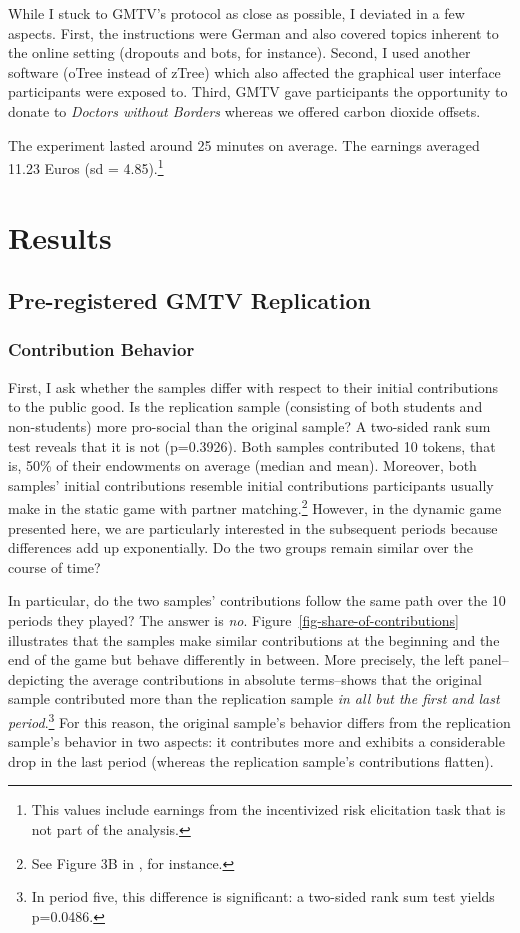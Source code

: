 \documentclass[
  authoryear,
  preprint,
  3p]{elsarticle}
\begin{document}
While I stuck to GMTV's protocol as close as possible, I deviated in a
few aspects. First, the instructions were German and also covered topics
inherent to the online setting (dropouts and bots, for instance).
Second, I used another software (oTree instead of zTree) which also
affected the graphical user interface participants were exposed to.
Third, GMTV gave participants the opportunity to donate to \emph{Doctors
without Borders} whereas we offered carbon dioxide offsets.

The experiment lasted around 25 minutes on average. The earnings
averaged 11.23 Euros (sd = 4.85).\footnote{This values include earnings
  from the incentivized risk elicitation task that is not part of the
  analysis.}

\hypertarget{sec-results}{%
\section{Results}\label{sec-results}}

\hypertarget{sec-replication}{%
\subsection{Pre-registered GMTV Replication}\label{sec-replication}}

\hypertarget{sec-contributions}{%
\subsubsection{Contribution Behavior}\label{sec-contributions}}

First, I ask whether the samples differ with respect to their initial
contributions to the public good. Is the replication sample (consisting
of both students and non-students) more pro-social than the original
sample? A two-sided rank sum test reveals that it is not (p=0.3926).
Both samples contributed 10 tokens, that is, 50\% of their endowments on
average (median and mean). Moreover, both samples' initial contributions
resemble initial contributions participants usually make in the static
game with partner matching.\footnote{See Figure 3B in
  \citet[p.989]{fehrgaechter2000}, for instance.} However, in the
dynamic game presented here, we are particularly interested in the
subsequent periods because differences add up exponentially. Do the two
groups remain similar over the course of time?

In particular, do the two samples' contributions follow the same path
over the 10 periods they played? The answer is \emph{no}.
Figure~\ref{fig-share-of-contributions} illustrates that the samples
make similar contributions at the beginning and the end of the game but
behave differently in between. More precisely, the left panel--depicting
the average contributions in absolute terms--shows that the original
sample contributed more than the replication sample \emph{in all but the
first and last period}.\footnote{In period five, this difference is
  significant: a two-sided rank sum test yields p=0.0486.} For this
reason, the original sample's behavior differs from the replication
sample's behavior in two aspects: it contributes more and exhibits a
considerable drop in the last period (whereas the replication sample's
contributions flatten).
\end{document}
